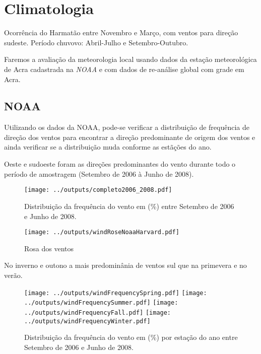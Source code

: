 \section{Climatologia}

Ocorrência do Harmatão entre Novembro e Março, com ventos para direção sudeste.
Período chuvovo: Abril-Julho e Setembro-Outubro.

Faremos a avaliação da meteorologia local usando dados da estação meteorológica
de Acra cadastrada na \textit{NOAA} e com dados de re-análise global com grade
em Acra. 

\subsection{NOAA}
Utilizando os dados da NOAA, pode-se verificar a distribuição de frequência de
direção dos ventos para encontrar a direção predominante de origem dos ventos e 
ainda verificar se a distribuição muda conforme as estãções do ano.  


Oeste e sudoeste foram as direções predominantes do vento durante todo o período 
de amostragem (Setembro de 2006 à Junho de 2008).
 
\begin{figure}[H]
\begin{center}
  \texttt{[image: ../outputs/completo2006\_2008.pdf]}
  \caption{Distribuição da frequência do vento em (\%) entre
           Setembro de 2006 e Junho de 2008.}
\end{center}
\end{figure}


\begin{figure}[H]
\begin{center}
  \texttt{[image: ../outputs/windRoseNoaaHarvard.pdf]}
  \caption{Rosa dos ventos}
\end{center}
\end{figure}


No inverno e outono a mais predominânia de ventos sul que na primevera 
e no verão. 

\begin{figure}[H]
\begin{center}
  \texttt{[image: ../outputs/windFrequencySpring.pdf]}
  \texttt{[image: ../outputs/windFrequencySummer.pdf]}
  \texttt{[image: ../outputs/windFrequencyFall.pdf]}
  \texttt{[image: ../outputs/windFrequencyWinter.pdf]}
\end{center}

\caption{Distribuição da frequência do vento em (\%) por estação do ano entre
         Setembro de 2006 e Junho de 2008.}
\end{figure}


